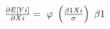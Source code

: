 $\frac{{\partial E\left[ {Yi} \right]}}{{\partial Xi}} = {\rm{\ }}\varphi {\rm{\ }}\left( {\frac{{\beta 1Xi}}{\sigma }} \right){\rm{\ }}\beta 1$
